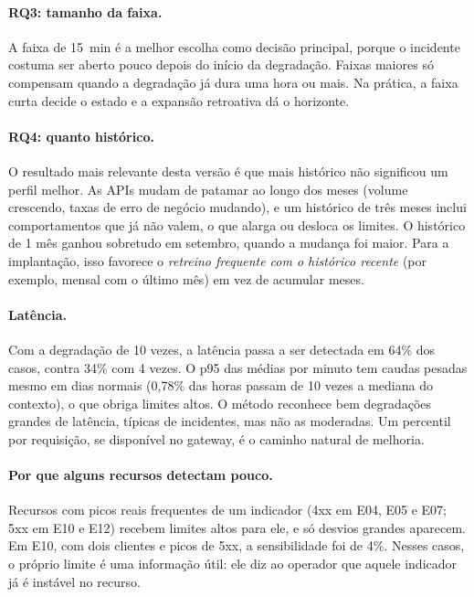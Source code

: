 \documentclass[sigconf,nonacm]{acmart}
\begin{document}
\paragraph{RQ3: tamanho da faixa.} A faixa de 15~min é a melhor escolha como decisão principal, porque o incidente costuma ser aberto pouco depois do início da degradação. Faixas maiores só compensam quando a degradação já dura uma hora ou mais. Na prática, a faixa curta decide o estado e a expansão retroativa dá o horizonte.

\paragraph{RQ4: quanto histórico.} O resultado mais relevante desta versão é que mais histórico não significou um perfil melhor. As APIs mudam de patamar ao longo dos meses (volume crescendo, taxas de erro de negócio mudando), e um histórico de três meses inclui comportamentos que já não valem, o que alarga ou desloca os limites. O histórico de 1 mês ganhou sobretudo em setembro, quando a mudança foi maior. Para a implantação, isso favorece o \emph{retreino frequente com o histórico recente} (por exemplo, mensal com o último mês) em vez de acumular meses.

\paragraph{Latência.} Com a degradação de 10 vezes, a latência passa a ser detectada em 64\% dos casos, contra 34\% com 4 vezes. O p95 das médias por minuto tem caudas pesadas mesmo em dias normais (0,78\% das horas passam de 10 vezes a mediana do contexto), o que obriga limites altos. O método reconhece bem degradações grandes de latência, típicas de incidentes, mas não as moderadas. Um percentil por requisição, se disponível no gateway, é o caminho natural de melhoria.

\paragraph{Por que alguns recursos detectam pouco.} Recursos com picos reais frequentes de um indicador (4xx em E04, E05 e E07; 5xx em E10 e E12) recebem limites altos para ele, e só desvios grandes aparecem. Em E10, com dois clientes e picos de 5xx, a sensibilidade foi de 4\%. Nesses casos, o próprio limite é uma informação útil: ele diz ao operador que aquele indicador já é instável no recurso.

\end{document}
